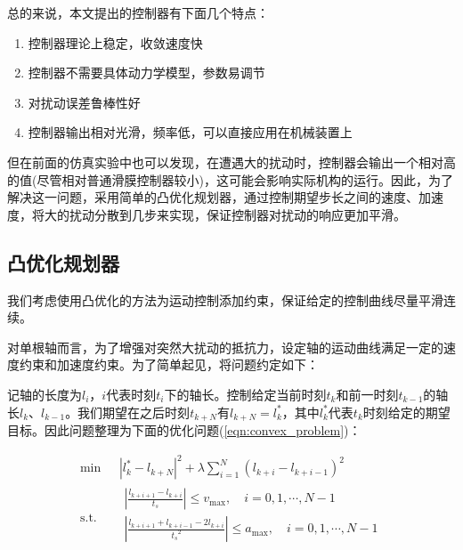 总的来说，本文提出的控制器有下面几个特点：

\begin{enumerate}
    \item 控制器理论上稳定，收敛速度快
    \item 控制器不需要具体动力学模型，参数易调节
    \item 对扰动误差鲁棒性好
    \item 控制器输出相对光滑，频率低，可以直接应用在机械装置上
\end{enumerate}

但在前面的仿真实验中也可以发现，在遭遇大的扰动时，控制器会输出一个相对高的值(尽管相对普通滑膜控制器较小)，这可能会影响实际机构的运行。因此，为了解决这一问题，采用简单的凸优化规划器，通过控制期望步长之间的速度、加速度，将大的扰动分散到几步来实现，保证控制器对扰动的响应更加平滑。
\FloatBarrier
\subsection{凸优化规划器}

我们考虑使用凸优化的方法为运动控制添加约束，保证给定的控制曲线尽量平滑连续。

对单根轴而言，为了增强对突然大扰动的抵抗力，设定轴的运动曲线满足一定的速度约束和加速度约束。为了简单起见，将问题约定如下：

记轴的长度为$l_i$，$i$代表时刻$t_i$下的轴长。控制给定当前时刻$t_k$和前一时刻$t_{k-1}$的轴长$l_{k}$、$l_{k-1}$。我们期望在之后时刻$t_{k+N}$有$l_{k+N}=l_{k}^*$，其中$l_{k}^*$代表$t_k$时刻给定的期望目标。因此问题整理为下面的优化问题(\ref{eqn:convex_problem})：

\begin{equation}
    \begin{aligned}
        \min &\left| l_{k}^{*}-l_{k+N} \right|^2+\lambda \sum_{i=1}^N{\left( l_{k+i}-l_{k+i-1} \right) ^2}\\
        \mathrm{s}.\mathrm{t}.\quad &\begin{array}{c}
        \left| \frac{l_{k+i+1}-l_{k+i}}{t_s} \right|\le v_{\max}, \quad i=0,1,\cdots ,N-1\\
        \left| \frac{l_{k+i+1}+l_{k+i-1}-2l_{k+i}}{{t_s}^2} \right|\le a_{\max}, \quad i=0,1,\cdots ,N-1\\
    \end{array}\\
    \end{aligned}
    \label{eqn:convex_problem}
\end{equation}

